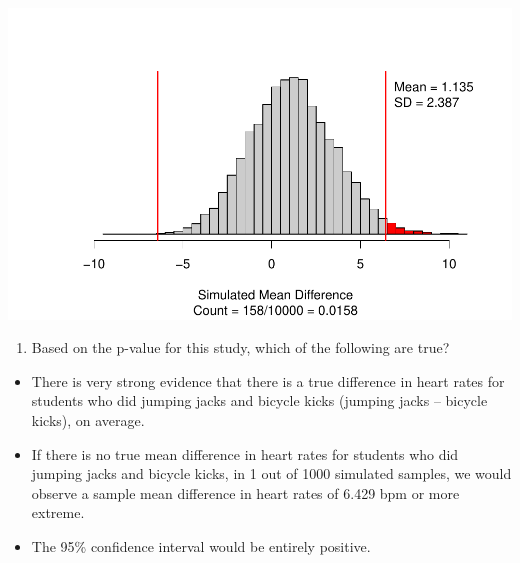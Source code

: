 \documentclass[
]{report}
\providecommand{\tightlist}{%
  \setlength{\itemsep}{0pt}\setlength{\parskip}{0pt}}
\begin{document}
\begin{center}\includegraphics[width=0.7\linewidth]{14-UR-module11_review_files/figure-latex/unnamed-chunk-3-1} \end{center}

\begin{enumerate}
\def\labelenumi{\arabic{enumi}.}
\setcounter{enumi}{8}
\tightlist
\item
  Based on the p-value for this study, which of the following are true?
\end{enumerate}

\vspace{0.3mm}

\begin{itemize}
\tightlist
\item
  There is very strong evidence that there is a true difference in heart rates for students who did jumping jacks and bicycle kicks (jumping jacks -- bicycle kicks), on average.
\end{itemize}

\vspace{0.5in}

\begin{itemize}
\tightlist
\item
  If there is no true mean difference in heart rates for students who did jumping jacks and bicycle kicks, in 1 out of 1000 simulated samples, we would observe a sample mean difference in heart rates of 6.429 bpm or more extreme.
\end{itemize}

\vspace{0.5in}

\begin{itemize}
\tightlist
\item
  The 95\% confidence interval would be entirely positive.
\end{itemize}

\vspace{0.5in}
\end{document}
